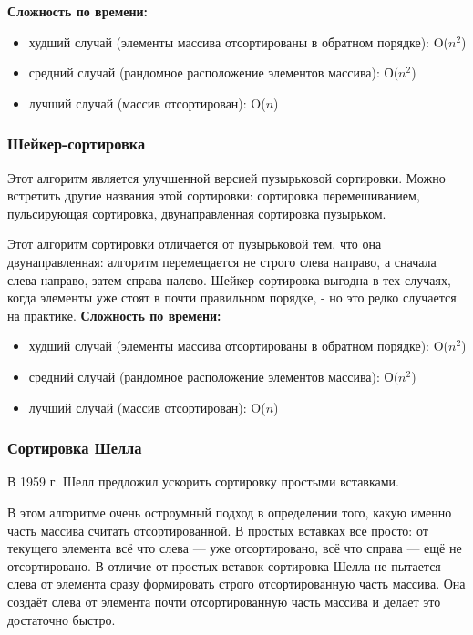 \documentclass[a4paper]{article}
\begin{document}
	\textbf{Сложность по времени:}
	\begin{itemize}
	\item худший случай (элементы массива отсортированы в обратном порядке): O($n^{2}$) 
	\item средний случай (рандомное расположение элементов массива): О$(n^{2}$)
	\item лучший случай (массив отсортирован): O($n$)
	\end{itemize}

	\subsubsection{Шейкер-сортировка}
	Этот алгоритм является улучшенной версией пузырьковой сортировки. Можно встретить другие  названия этой сортировки: сортировка перемешиванием, пульсирующая сортировка, двунаправленная сортировка пузырьком.
	
	Этот алгоритм сортировки отличается от пузырьковой тем, что она двунаправленная: алгоритм перемещается не строго слева направо, а сначала слева направо, затем справа налево.
	Шейкер-сортировка выгодна в тех случаях, когда элементы уже стоят в почти правильном порядке, - но это редко случается на практике.
	\textbf{Сложность по времени:}
	\begin{itemize}
		\item худший случай (элементы массива отсортированы в обратном порядке): O($n^{2}$) 
		\item средний случай (рандомное расположение элементов массива): О$(n^{2}$)
		\item лучший случай (массив отсортирован): O($n$)
	\end{itemize}


	\subsubsection{Сортировка Шелла}
	В 1959 г. Шелл предложил ускорить сортировку простыми вставками. 
	
	В этом алгоритме очень остроумный подход в определении того, какую именно часть массива считать отсортированной. В простых вставках все просто: от текущего элемента всё что слева — уже отсортировано, всё что справа — ещё не отсортировано. В отличие от простых вставок сортировка Шелла не пытается слева от элемента сразу формировать строго отсортированную часть массива. Она создаёт слева от элемента почти отсортированную часть массива и делает это достаточно быстро.
	
\end{document}
